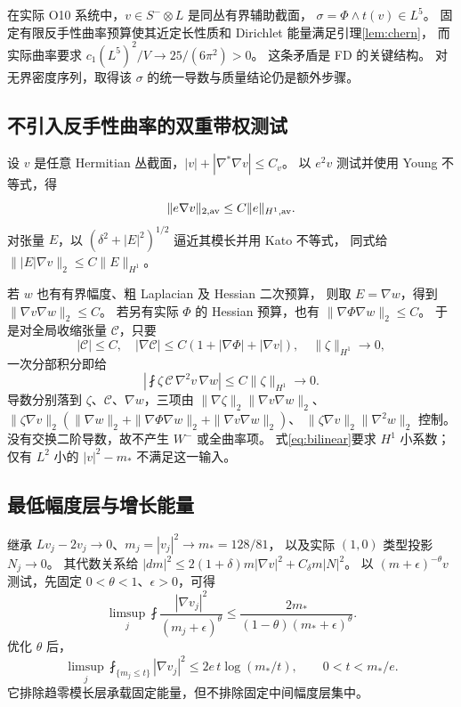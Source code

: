 \documentclass[UTF8,11pt,a4paper,fontset=none]{ctexart}
\numberwithin{equation}{section}
\theoremstyle{definition}
\theoremstyle{remark}\newtheorem{remark}[theorem]{说明}
\newcommand{\avint}{\fint}
\begin{document}
在实际 O10 系统中，$v\in S^-\otimes L$ 是同丛有界辅助截面，
$\sigma=\Phi\wedge t(v)\in L^5$。
固定有限反手性曲率预算使其近定长性质和 Dirichlet 能量满足引理\ref{lem:chern}，
而实际曲率要求 $c_1(L^5)^2/V\to25/(6\pi^2)>0$。
这条矛盾是 FD 的关键结构。
对无界密度序列，取得该 $\sigma$ 的统一导数与质量结论仍是额外步骤。

\subsection{不引入反手性曲率的双重带权测试}
设 $v$ 是任意 Hermitian 丛截面，$|v|+|\nabla^*\nabla v|\le C_v$。
以 $e^2v$ 测试并使用 Young 不等式，得
\begin{equation}\label{eq:weighted}
\|e\nabla v\|_{2,\rm av}\le C\|e\|_{H^1,\rm av}.
\end{equation}
对张量 $E$，以 $(\delta^2+|E|^2)^{1/2}$ 逼近其模长并用 Kato 不等式，
同式给 $\||E|\nabla v\|_2\le C\|E\|_{H^1}$。

若 $w$ 也有有界幅度、粗 Laplacian 及 Hessian 二次预算，
则取 $E=\nabla w$，得到 $\|\nabla v\nabla w\|_2\le C$。
若另有实际 $\Phi$ 的 Hessian 预算，也有 $\|\nabla\Phi\nabla w\|_2\le C$。
于是对全局收缩张量 $\mathcal C$，只要
\[
|\mathcal C|\le C,\quad
|\nabla\mathcal C|\le C(1+|\nabla\Phi|+|\nabla v|),\quad
\|\zeta\|_{H^1}\to0,
\]
一次分部积分即给
\begin{equation}\label{eq:bilinear}
\left|\avint\zeta\,\mathcal C\,\nabla^2v\,\nabla w\right|
\le C\|\zeta\|_{H^1}\to0.
\end{equation}
导数分别落到 $\zeta$、$\mathcal C$、$\nabla w$，三项由
$\|\nabla\zeta\|_2\|\nabla v\nabla w\|_2$、
$\|\zeta\nabla v\|_2(\|\nabla w\|_2+\|\nabla\Phi\nabla w\|_2+\|\nabla v\nabla w\|_2)$、
$\|\zeta\nabla v\|_2\|\nabla^2w\|_2$ 控制。
没有交换二阶导数，故不产生 $W^-$ 或全曲率项。
式\eqref{eq:bilinear}要求 $H^1$ 小系数；仅有 $L^2$ 小的 $|v|^2-m_*$ 不满足这一输入。

\subsection{最低幅度层与增长能量}
继承 $Lv_j-2v_j\to0$、$m_j=|v_j|^2\to m_*=128/81$，
以及实际 $(1,0)$ 类型投影 $N_j\to0$。
其代数关系给
$|dm|^2\le2(1+\delta)m|\nabla v|^2+C_\delta m|N|^2$。
以 $(m+\epsilon)^{-\theta}v$ 测试，先固定 $0<\theta<1$、$\epsilon>0$，可得\cite{LowAmplitude}
\[
\limsup_j\avint\frac{|\nabla v_j|^2}{(m_j+\epsilon)^\theta}
\le\frac{2m_*}{(1-\theta)(m_*+\epsilon)^\theta}.
\]
优化 $\theta$ 后，
\begin{equation}\label{eq:low-amplitude}
\limsup_j\avint_{\{m_j\le t\}}|\nabla v_j|^2
\le2e\,t\log(m_*/t),\qquad 0<t<m_*/e.
\end{equation}
它排除趋零模长层承载固定能量，但不排除固定中间幅度层集中。
\end{document}
